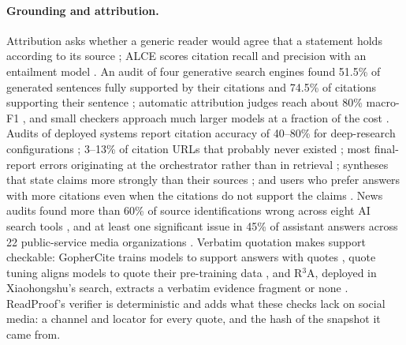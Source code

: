 \documentclass[11pt]{article}
\begin{document}
\paragraph{Grounding and attribution.}
Attribution asks whether a generic reader would agree that a statement holds according to its source
\citep{rashkin2021ais}; ALCE scores citation recall and precision with an entailment model
\citep{gao2023alce}. An audit of four generative search engines found 51.5\% of generated sentences fully
supported by their citations and 74.5\% of citations supporting their sentence \citep{liu2023verifiability};
automatic attribution judges reach about 80\% macro-F1 \citep{li2024attributionbench}, and small checkers
approach much larger models at a fraction of the cost \citep{tang2024minicheck}. Audits of deployed systems
report citation accuracy of 40--80\% for deep-research configurations \citep{venkit2025deeptrace}; 3--13\%
of citation URLs that probably never existed \citep{rao2026reference}; most final-report errors originating
at the orchestrator rather than in retrieval \citep{hirsch2026blame}; syntheses that state claims more
strongly than their sources \citep{singharoy2026smoothing}; and users who prefer answers with more citations
even when the citations do not support the claims \citep{miroyan2026searcharena}. News audits found more than
60\% of source identifications wrong across eight AI search tools \citep{jazwinska2025tow}, and at least one
significant issue in 45\% of assistant answers across 22 public-service media organizations
\citep{ebu2025newsintegrity}. Verbatim quotation makes support checkable: GopherCite trains models to support
answers with quotes \citep{menick2022gophercite}, quote tuning aligns models to quote their pre-training data
\citep{zhang2025verifiable}, and R$^3$A, deployed in Xiaohongshu's search, extracts a verbatim evidence
fragment or none \citep{yuan2026r3a}. ReadProof's verifier is deterministic and adds what these checks lack on
social media: a channel and locator for every quote, and the hash of the snapshot it came from.
\end{document}
